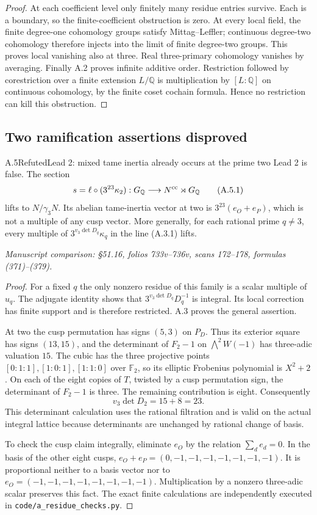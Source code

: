 \begin{proof}
At each coefficient level only finitely many residue entries
survive. Each is a boundary, so the finite-coefficient obstruction
is zero. At every local field, the finite degree-one cohomology
groups satisfy Mittag--Leffler; continuous degree-two cohomology
therefore injects into the limit of finite degree-two groups.
This proves local vanishing also at three. Real three-primary
cohomology vanishes by averaging. Finally A.2 proves infinite
additive order. Restriction followed by corestriction over a finite
extension $L/\mathbb Q$ is multiplication by $[L:\mathbb Q]$ on
continuous cohomology, by the finite coset cochain formula.
Hence no restriction can kill this obstruction.
\end{proof}

\subsection{Two ramification assertions disproved}

\begin{statement}{A.5}{Refuted}{Lead 2: mixed tame inertia already occurs at the prime two}
Lead 2 is false. The section
\[
 s=\ell\circ(3^{23}\kappa_2)
       :G_{\mathbb Q}\longrightarrow N^{\rm cc}\rtimes G_{\mathbb Q}
 \tag{A.5.1}
\]
lifts to $N/\gamma_3N$. Its abelian tame-inertia vector at two is
$3^{23}(e_O+e_P)$, which is not a multiple of any cusp vector.
More generally, for each rational prime $q\ne3$, every multiple
of $3^{v_3\det D_q}\kappa_q$ in the line (A.3.1) lifts.
\par\smallskip\noindent\emph{Manuscript comparison: \S51.16,
folios 733v--736v, scans 172--178, formulas (371)--(379).}
\end{statement}
\begin{proof}
For a fixed $q$ the only nonzero residue of this family is a scalar
multiple of $u_q$. The adjugate identity shows that
$3^{v_3\det D_q}D_q^{-1}$ is integral. Its local correction has
finite support and is therefore restricted. A.3 proves the general
assertion.

At two the cusp permutation has signs $(5,3)$ on $P_D$. Thus its
exterior square has signs $(13,15)$, and the determinant of
$F_2-1$ on $\bigwedge^2W(-1)$ has three-adic valuation $15$.
The cubic has the three projective points
$[0:1:1],[1:0:1],[1:1:0]$ over $\mathbb F_2$, so its elliptic
Frobenius polynomial is $X^2+2$. On each of the eight copies of
$T$, twisted by a cusp permutation sign, the determinant of
$F_2-1$ is three. The remaining contribution is eight. Consequently
\[
 v_3\det D_2=15+8=23.
\]
This determinant calculation uses the rational filtration and is
valid on the actual integral lattice because determinants are
unchanged by rational change of basis.

To check the cusp claim integrally, eliminate $e_O$ by the relation
$\sum_de_d=0$. In the basis of the other eight cusps,
$e_O+e_P=(0,-1,-1,-1,-1,-1,-1,-1)$. It is proportional neither
to a basis vector nor to $e_O=(-1,-1,-1,-1,-1,-1,-1,-1)$.
Multiplication by a nonzero three-adic scalar preserves this fact.
The exact finite calculations are independently executed in
\texttt{code/a\_residue\_checks.py}.
\end{proof}

